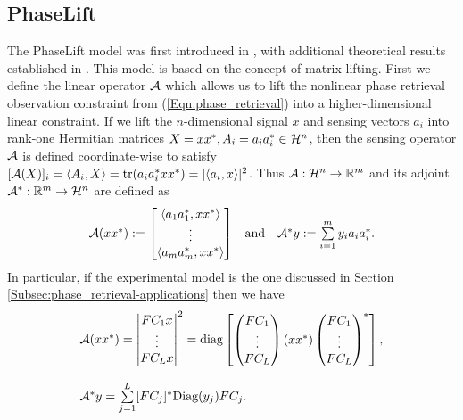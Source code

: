 

\subsection{PhaseLift}

The PhaseLift model was first introduced in \cite{DBLP:journals/siamis/CandesESV13}, with additional theoretical results established in \cite{candes2013phaselift}.  This model is based on the concept of matrix lifting.  First we define the linear operator ${\mathcal A}$ which allows us to lift the nonlinear phase retrieval observation constraint from (\ref{Eqn:phase_retrieval}) into a higher-dimensional linear constraint.  If we lift the $n$-dimensional signal $x$ and sensing vectors $a_i$ into rank-one Hermitian matrices $X = xx^*, A_i = a_ia_i^* \in {\mathcal H}^n$, then the sensing operator ${\mathcal A}$ is defined coordinate-wise to satisfy $[{\mathcal A} (X)]_i = \langle A_i, X \rangle = \mathrm{tr}( a_i a_i^* xx^* )= | \langle a_i, x \rangle |^2$.  Thus ${\mathcal A}: {\mathcal H}^n \rightarrow {\mathbb R}^m$ and its adjoint ${\mathcal A}^* : {\mathbb R}^m \rightarrow {\mathcal H}^n$ are defined as
\begin{equation} 			\label{Eqn:A_definition}
\begin{array}{lcr}
{\mathcal A}(xx^*)
	:= \begin{bmatrix} \langle a_1 a_1^*, xx^* \rangle \\ \vdots \\ \langle a_m a_m^*, xx^* \rangle \end{bmatrix}
		
	& 	\text{and}
		&	{\mathcal A}^*y
			  := \sum\limits_{\substack{i = 1}}^{\substack{m}} y_ia_ia_i^*.
\end{array}
\end{equation}
In particular, if the experimental model is the one discussed in Section \ref{Subsec:phase_retrieval-applications} then we have
\begin{equation} 			\label{Eqn:A_definition_with_masks}
\begin{array}{l}
{\mathcal A}(xx^*)
		= \begin{vmatrix}
				FC_1x \\ \vdots \\ FC_Lx
			\end{vmatrix}^2
			= \textnormal{diag}\begin{bmatrix}
			\begin{pmatrix}
			FC_1 \\ \vdots \\ FC_L
			\end{pmatrix}
		 	(xx^*)
	 		\begin{pmatrix}
			FC_1 \\ \vdots \\ FC_L
		 	\end{pmatrix}^*
		\end{bmatrix},
									\\
									\\
{\mathcal A}^*y
			  =\sum\limits_{\substack{j=1}}^{\substack{L}}
					[FC_j]^* \textnormal{Diag}(y_j) F C_j.
\end{array}
\end{equation}






